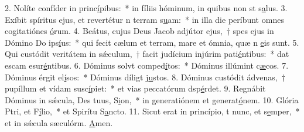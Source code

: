 2. Nolíte confíder in princ\uline{í}pibus:~* in fíliis hóminum, in quibus non st s\uline{a}lus.
3. Exíbit spíritus ejus, et revertétur n terram s\uline{u}am:~* in illa die períbunt omnes cogitatiónes \uline{ó}rum.
4. Beátus, cujus Deus Jacob adjútor ejus,~† spes ejus in Dómino Do ips\uline{í}us:~* qui fecit cælum et terram, mare et ómnia, quæ n \uline{e}is sunt.
5. Qui custódit veritátem in sǽculum,~† facit judícium injúrim pati\uline{é}ntibus:~* dat escam esur\uline{é}ntibus.
6. Dóminus solvt comped\uline{í}tos:~* Dóminus illúmint c\uline{æ}cos.
7. Dóminus érgit el\uline{í}sos:~* Dóminus díligt j\uline{u}stos.
8. Dóminus custódit ádvenas,~† pupíllum et vídam susc\uline{í}piet:~* et vias peccatórum dsp\uline{é}rdet.
9. Regnábit Dóminus in sǽcula, Des tuus, S\uline{i}on,~* in generatiónem et generat\uline{ó}nem.
10. Glória Ptri, et F\uline{í}lio,~* et Spirítu S\uline{a}ncto.
11. Sicut erat in princípio, t nunc, et s\uline{e}mper,~* et in sǽcula sæculórm. \uline{A}men.
